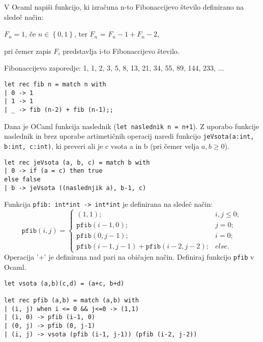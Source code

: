 \begin{ex}
V Ocaml napi\v si funkcijo, ki izra\v cuna n-to Fibonaccijevo \v stevilo definirano na slede\v c na\v cin:
\begin{center}
$F_n = 1$, \v ce $n\in \left\{ 0,1\right\}$, ter 
$F_n$ = $F_n-1 + F_n-2$, 
\end{center}
pri \v cemer zapis $F_i$ predstavlja i-to Fibonaccijevo \v stevilo. 

Fibonaccijevo zaporedje: 1, 1, 2, 3, 5, 8, 13, 21, 34, 55, 89, 144, 233, ...

\begin{sol}
\begin{verbatim}
let rec fib n = match n with
| 0 -> 1
| 1 -> 1
| _ -> fib (n-2) + fib (n-1);;
\end{verbatim}
\end{sol}



\end{ex}
\begin{ex}
Dana je OCaml funkcija naslednik (\texttt{let naslednik n = n+1}). Z uporabo funkcije naslednik in brez uporabe artimeti\v cnih operacij naredi funkcijo \texttt{jeVsota(a:int, b:int, c:int)}, ki preveri ali je c vsota a in b (pri \v cemer velja $a,b\geq 0$).


\begin{sol}
\begin{verbatim}
let rec jeVsota (a, b, c) = match b with
| 0 -> if (a = c) then true
else false
| b -> jeVsota ((naslednjik a), b-1, c)
\end{verbatim}
\end{sol}



\end{ex}
\begin{ex}
Funkcija \texttt{pfib: int*int -> int*int} je definirana na slede\v c na\v cin:
$$
\mathtt{pfib}(i,j)=\begin{cases}
(1,1); & i,j\le0;\\
\mathtt{pfib}(i-1,0); & j=0;\\
\mathtt{pfib}(0,j-1); & i=0;\\
\mathtt{pfib}(i-1,j-1)+\mathtt{pfib}(i-2,j-2); & else.
\end{cases}
$$
Operacija '+' je definirana nad pari na obi\v cajen na\v cin. Definiraj funkcijo \texttt{pfib} v Ocaml.

\begin{sol}
\begin{verbatim}
let vsota (a,b)(c,d) = (a+c, b+d)

let rec pfib (a,b) = match (a,b) with
| (i, j) when i <= 0 && j<=0 -> (1,1)
| (i, 0) -> pfib (i-1, 0)
| (0, j) -> pfib (0, j-1)
| (i, j) -> vsota (pfib (i-1, j-1)) (pfib (i-2, j-2))    
\end{verbatim}
\end{sol}



\end{ex}
